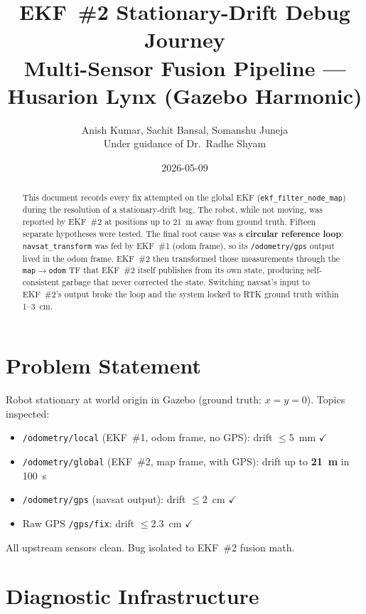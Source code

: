 \documentclass[11pt,a4paper]{article}
\title{\textbf{EKF~\#2 Stationary-Drift Debug Journey}\\
\large Multi-Sensor Fusion Pipeline --- Husarion Lynx (Gazebo Harmonic)}
\author{Anish Kumar, Sachit Bansal, Somanshu Juneja\\
Under guidance of Dr.~Radhe Shyam}
\date{2026-05-09}
\newcommand{\good}[1]{\textcolor{good}{\textbf{#1}}}
\newcommand{\bad}[1]{\textcolor{bad}{\textbf{#1}}}
\begin{document}
\maketitle

\begin{abstract}
This document records every fix attempted on the global EKF (\texttt{ekf\_filter\_node\_map})
during the resolution of a stationary-drift bug. The robot, while not moving, was reported by
EKF~\#2 at positions up to 21~m away from ground truth. Fifteen separate hypotheses were tested.
The final root cause was a \textbf{circular reference loop}: \texttt{navsat\_transform} was
fed by EKF~\#1 (odom frame), so its \texttt{/odometry/gps} output lived in the odom frame.
EKF~\#2 then transformed those measurements through the \texttt{map$\to$odom} TF that EKF~\#2
itself publishes from its own state, producing self-consistent garbage that never corrected the
state. Switching navsat's input to EKF~\#2's output broke the loop and the system locked to RTK
ground truth within 1--3~cm.
\end{abstract}

\section{Problem Statement}

Robot stationary at world origin in Gazebo (ground truth: $x=y=0$). Topics inspected:
\begin{itemize}[noitemsep]
\item \texttt{/odometry/local} (EKF~\#1, odom frame, no GPS): drift $\le 5$~mm \good{$\checkmark$}
\item \texttt{/odometry/global} (EKF~\#2, map frame, with GPS): drift up to \bad{21~m} in 100~s
\item \texttt{/odometry/gps} (navsat output): drift $\le 2$~cm \good{$\checkmark$}
\item Raw GPS \texttt{/gps/fix}: drift $\le 2.3$~cm \good{$\checkmark$}
\end{itemize}

\noindent
All upstream sensors clean. Bug isolated to EKF~\#2 fusion math.

\section{Diagnostic Infrastructure}
\end{document}
